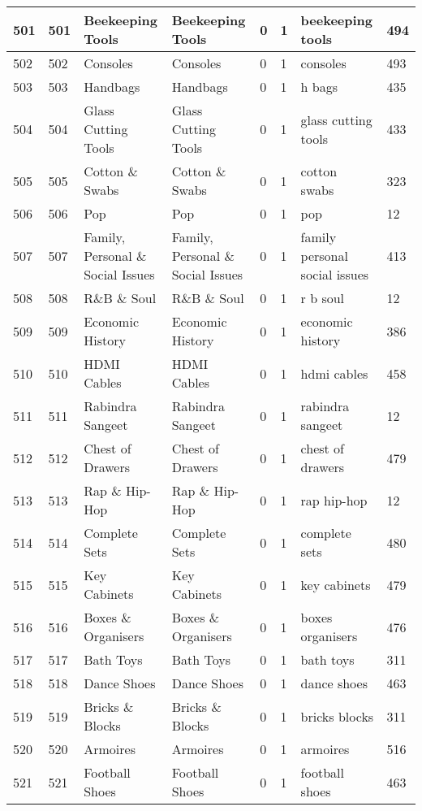 \begin{longtable}{|l|l|l|l|l|l|l|l|}
501 & 501 & Beekeeping Tools & Beekeeping Tools & 0 & 1 & beekeeping tools & 494 \\ \hline 
502 & 502 & Consoles & Consoles & 0 & 1 & consoles & 493 \\ \hline 
503 & 503 & Handbags & Handbags & 0 & 1 & h bags & 435 \\ \hline 
504 & 504 & Glass Cutting Tools & Glass Cutting Tools & 0 & 1 & glass cutting tools & 433 \\ \hline 
505 & 505 & Cotton \& Swabs & Cotton \& Swabs & 0 & 1 & cotton swabs & 323 \\ \hline 
506 & 506 & Pop & Pop & 0 & 1 & pop & 12 \\ \hline 
507 & 507 & Family, Personal \& Social Issues & Family, Personal \& Social Issues & 0 & 1 & family personal social issues & 413 \\ \hline 
508 & 508 & R\&B \& Soul & R\&B \& Soul & 0 & 1 & r b soul & 12 \\ \hline 
509 & 509 & Economic History & Economic History & 0 & 1 & economic history & 386 \\ \hline 
510 & 510 & HDMI Cables & HDMI Cables & 0 & 1 & hdmi cables & 458 \\ \hline 
511 & 511 & Rabindra Sangeet & Rabindra Sangeet & 0 & 1 & rabindra sangeet & 12 \\ \hline 
512 & 512 & Chest of Drawers & Chest of Drawers & 0 & 1 & chest of drawers & 479 \\ \hline 
513 & 513 & Rap \& Hip-Hop & Rap \& Hip-Hop & 0 & 1 & rap hip-hop & 12 \\ \hline 
514 & 514 & Complete Sets & Complete Sets & 0 & 1 & complete sets & 480 \\ \hline 
515 & 515 & Key Cabinets & Key Cabinets & 0 & 1 & key cabinets & 479 \\ \hline 
516 & 516 & Boxes \& Organisers & Boxes \& Organisers & 0 & 1 & boxes organisers & 476 \\ \hline 
517 & 517 & Bath Toys & Bath Toys & 0 & 1 & bath toys & 311 \\ \hline 
518 & 518 & Dance Shoes & Dance Shoes & 0 & 1 & dance shoes & 463 \\ \hline 
519 & 519 & Bricks \& Blocks & Bricks \& Blocks & 0 & 1 & bricks blocks & 311 \\ \hline 
520 & 520 & Armoires & Armoires & 0 & 1 & armoires & 516 \\ \hline 
521 & 521 & Football Shoes & Football Shoes & 0 & 1 & football shoes & 463 \\ \hline 

\end{longtable}
